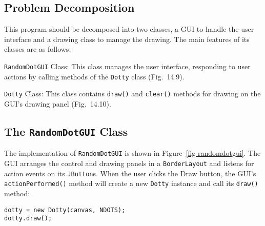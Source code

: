 \begin{figure}[tb]
\end{figure}

\subsection*{Problem Decomposition}

\noindent This program should be decomposed into two classes, a GUI to handle
the user interface and a drawing class to manage the drawing.
The main features of its classes are as follows:

\begin{BL}
\item  {\tt RandomDotGUI} Class: This class manages the user interface,
responding to user actions by calling methods of the {\tt Dotty} class
(Fig.~14.9).

\item  {\tt Dotty} Class:  This class contains {\tt draw()} and {\tt clear()}
methods for drawing on the GUI's drawing panel (Fig.~14.10).
\end{BL}



\subsection*{The {\tt RandomDotGUI} Class}
\noindent The implementation of {\tt RandomDotGUI} is shown in
Figure~\ref{fig-randomdotgui}.  The GUI arranges the control and
drawing panels in a {\tt BorderLayout} and listens for action events
on its {\tt JButton}s.  When the user clicks the Draw button, the
GUI's {\tt action\-Per\-formed()} method will create a new {\tt Dotty}
instance and call its {\tt draw()} method:

\begin{jjjlisting}
\begin{lstlisting}
dotty = new Dotty(canvas, NDOTS);
dotty.draw();
\end{lstlisting}
\end{jjjlisting}

